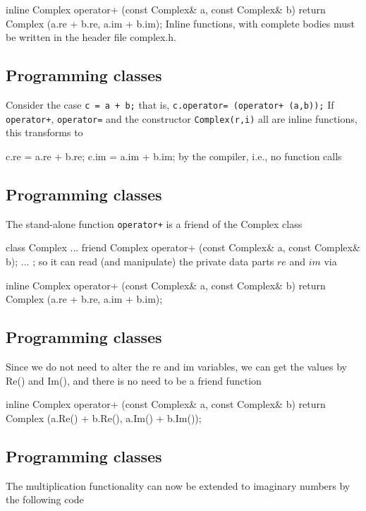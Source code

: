 \documentclass[%
oneside,                 %
final,                   %
10pt]{article}
\begin{document}
{{{{{{{{\bcppcod
inline Complex operator+ (const Complex& a, const Complex& b)
{ return Complex (a.re + b.re, a.im + b.im); }
\ecppcod
Inline functions, with complete bodies must be written in the header file  complex.h.

\subsection{Programming classes}

Consider  the case \Verb!c = a + b;!
that is,  \Verb!c.operator= (operator+ (a,b));!
If \Verb!operator+!, \Verb!operator=! and the constructor \Verb!Complex(r,i)! all
are inline functions, this transforms to

\bcppcod
c.re = a.re + b.re;
c.im = a.im + b.im;
\ecppcod
by the compiler, i.e., no function calls

\subsection{Programming classes}

The stand-alone function \Verb!operator+! is a friend of the Complex  class

\bcppcod
class Complex
{
   ...
   friend Complex operator+ (const Complex& a, const Complex& b);
   ...
};
\ecppcod
so it can read (and manipulate) the private data parts $re$ and
$im$ via

\bcppcod
inline Complex operator+ (const Complex& a, const Complex& b)
{ return Complex (a.re + b.re, a.im + b.im); }
\ecppcod

\subsection{Programming classes}

Since we do not need to alter the re and im variables, we can
get the values by Re() and Im(), and there is no need to be a
friend function

\bcppcod
inline Complex operator+ (const Complex& a, const Complex& b)
{ return Complex (a.Re() + b.Re(), a.Im() + b.Im()); }
\ecppcod

\subsection{Programming classes}

The multiplication functionality can now be extended to imaginary numbers by the following code

}}}}}}}}
\end{document}
